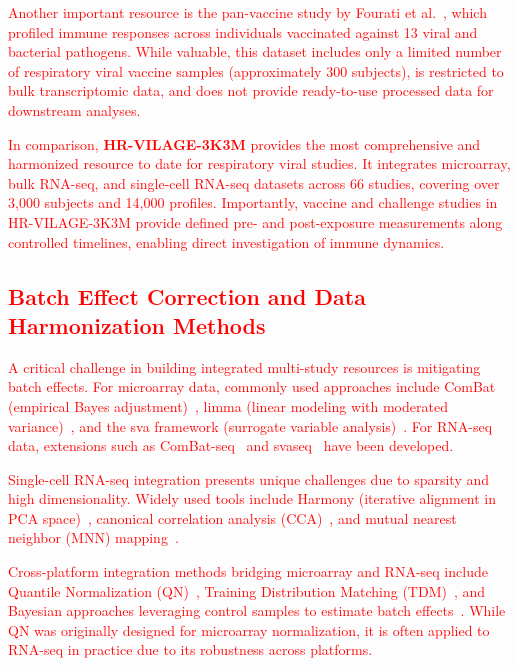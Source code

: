 \documentclass[
  12pt]{article}
\newcommand{\delmark}[1]{\textcolor{red}{#1}}
\begin{document}
\medskip
\delmark{Another important resource is the pan-vaccine study by Fourati et al.~\citep{fourati2022}, which profiled immune responses across individuals vaccinated against 13 viral and bacterial pathogens. While valuable, this dataset includes only a limited number of respiratory viral vaccine samples (approximately 300 subjects), is restricted to bulk transcriptomic data, and does not provide ready-to-use processed data for downstream analyses.}

\medskip
\delmark{In comparison, \textbf{HR-VILAGE-3K3M} provides the most comprehensive and harmonized resource to date for respiratory viral studies. It integrates microarray, bulk RNA-seq, and single-cell RNA-seq datasets across 66 studies, covering over 3,000 subjects and 14,000 profiles. Importantly, vaccine and challenge studies in HR-VILAGE-3K3M provide defined pre- and post-exposure measurements along controlled timelines, enabling direct investigation of immune dynamics.}

\medskip
\delmark{\subsection{Batch Effect Correction and Data Harmonization Methods}}
\delmark{A critical challenge in building integrated multi-study resources is mitigating batch effects. For microarray data, commonly used approaches include ComBat (empirical Bayes adjustment)~\citep{wang2017combat}, limma (linear modeling with moderated variance)~\citep{ritchie2015limma}, and the sva framework (surrogate variable analysis)~\citep{leek2012sva}. For RNA-seq data, extensions such as ComBat-seq~\citep{zhang2020combatseq} and svaseq~\citep{leek2014svaseq} have been developed.}

\medskip
\delmark{Single-cell RNA-seq integration presents unique challenges due to sparsity and high dimensionality. Widely used tools include Harmony (iterative alignment in PCA space)~\citep{korsunsky2019harmony}, canonical correlation analysis (CCA)~\citep{stuart2019comprehensive}, and mutual nearest neighbor (MNN) mapping~\citep{haghverdi2018mnn}.}

\medskip
\delmark{Cross-platform integration methods bridging microarray and RNA-seq include Quantile Normalization (QN)~\citep{bolstad2003}, Training Distribution Matching (TDM)~\citep{thompson2015}, and Bayesian approaches leveraging control samples to estimate batch effects~\citep{tang2021rankin}. While QN was originally designed for microarray normalization, it is often applied to RNA-seq in practice due to its robustness across platforms.}
\end{document}
